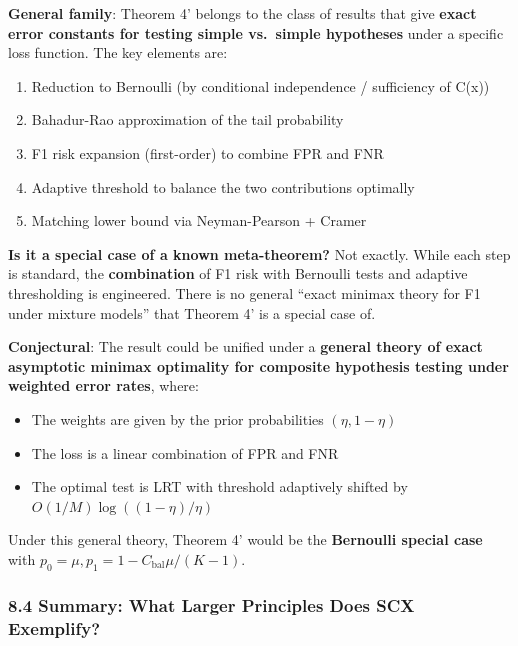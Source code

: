 \documentclass[
  12pt,
]{article}
\providecommand{\tightlist}{%
  \setlength{\itemsep}{0pt}\setlength{\parskip}{0pt}}
\begin{document}
\textbf{General family}: Theorem 4' belongs to the class of results that
give \textbf{exact error constants for testing simple vs.~simple
hypotheses} under a specific loss function. The key elements are:

\begin{enumerate}
\def\labelenumi{\arabic{enumi}.}
\tightlist
\item
  Reduction to Bernoulli (by conditional independence / sufficiency of
  C(x))
\item
  Bahadur-Rao approximation of the tail probability
\item
  F1 risk expansion (first-order) to combine FPR and FNR
\item
  Adaptive threshold to balance the two contributions optimally
\item
  Matching lower bound via Neyman-Pearson + Cramer
\end{enumerate}

\textbf{Is it a special case of a known meta-theorem?} Not exactly.
While each step is standard, the \textbf{combination} of F1 risk with
Bernoulli tests and adaptive thresholding is engineered. There is no
general ``exact minimax theory for F1 under mixture models'' that
Theorem 4' is a special case of.

\textbf{Conjectural}: The result could be unified under a
\textbf{general theory of exact asymptotic minimax optimality for
composite hypothesis testing under weighted error rates}, where:

\begin{itemize}
\tightlist
\item
  The weights are given by the prior probabilities \((\eta, 1-\eta)\)
\item
  The loss is a linear combination of FPR and FNR
\item
  The optimal test is LRT with threshold adaptively shifted by
  \(O(1/M)\log((1-\eta)/\eta)\)
\end{itemize}

Under this general theory, Theorem 4' would be the \textbf{Bernoulli
special case} with \(p_0 = \mu, p_1 = 1 - C_{\text{bal}}\mu/(K-1)\).

\subsubsection{8.4 Summary: What Larger Principles Does SCX
Exemplify?}\label{summary-what-larger-principles-does-scx-exemplify}
\end{document}
